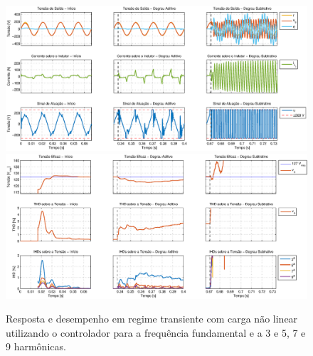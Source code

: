 \documentclass[repeatfields,oneside]{tcc}
\begin{document}
\begin{figure}[h]
    \centering
    \caption{Resposta e desempenho em regime transiente com carga não linear utilizando o controlador para a frequência fundamental e a 3{\textordfeminine} e 5{\textordfeminine}, 7{\textordfeminine} e 9{\textordfeminine} harmônicas.}
    \includegraphics[trim={80 50 1 20}, clip, width=\linewidth]{fig/closed_9.eps}
    \\\vspace{0.475cm}
    \includegraphics[trim={80 20 1 20}, clip, width=\linewidth]{fig/harm_9.eps}
    \label{fig:closed_9_app}
\end{figure}

\annex

\printbibliography
\end{document}
